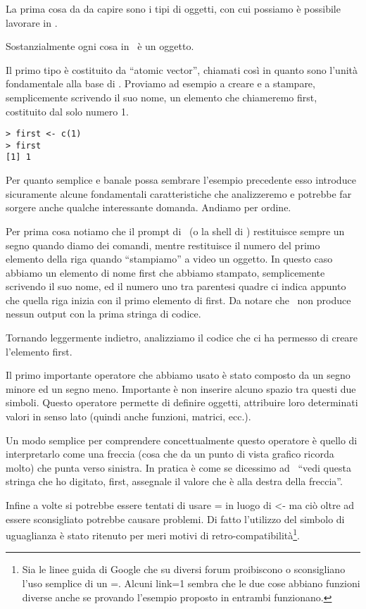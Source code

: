 La prima cosa da da capire sono i tipi di oggetti, con cui possiamo è possibile lavorare in \erre.

Sostanzialmente ogni cosa in \erre\ è un oggetto.

Il primo tipo è costituito da ``atomic vector'', chiamati così in quanto sono l'unità fondamentale alla base di \erre.
Proviamo ad esempio a creare e a stampare, semplicemente scrivendo il suo nome, un elemento che chiameremo first, costituito dal solo numero 1.

\begin{lstlisting}
> first <- c(1)
> first
[1] 1
\end{lstlisting}

Per quanto semplice e banale possa sembrare l'esempio precedente esso introduce sicuramente alcune fondamentali caratteristiche che analizzeremo e potrebbe far sorgere anche qualche interessante domanda. Andiamo per ordine.

Per prima cosa notiamo che il prompt di \erre\ (o la shell di \erre) restituisce sempre un segno \cod{>} quando diamo dei comandi, mentre restituisce il numero del primo elemento della riga quando ``stampiamo'' a video un oggetto. In questo caso abbiamo un elemento di nome first che abbiamo stampato, semplicemente scrivendo il suo nome, ed il numero uno tra parentesi quadre ci indica appunto che quella riga inizia con il primo elemento di first. Da notare che \erre\ non produce nessun output con la prima stringa di codice.

Tornando leggermente indietro, analizziamo il codice che ci ha permesso di creare l'elemento first.

Il primo importante operatore che abbiamo usato è stato \cod{<-} composto da un segno minore ed un segno meno. Importante è non inserire alcuno spazio tra questi due simboli. Questo operatore permette di definire oggetti, attribuire loro determinati valori in senso lato (quindi anche funzioni, matrici, ecc.).

Un modo semplice per comprendere concettualmente questo operatore è quello di interpretarlo come una freccia (cosa che da un punto di vista grafico ricorda molto) che punta verso sinistra. In pratica è come se dicessimo ad \erre\ ``vedi questa stringa che ho digitato, first, assegnale il valore che è alla destra della freccia''.

Infine a volte si potrebbe essere tentati di usare = in luogo di <- ma ciò oltre ad essere sconsigliato potrebbe causare problemi. Di fatto l'utilizzo del simbolo di uguaglianza è stato ritenuto per meri motivi di retro-compatibilità\footnote{Sia le linee guida di Google che su diversi forum proibiscono o sconsigliano l'uso semplice di un =. Alcuni link=1 sembra che le due cose abbiano funzioni diverse anche se provando l'esempio proposto in \erre entrambi funzionano.}.

